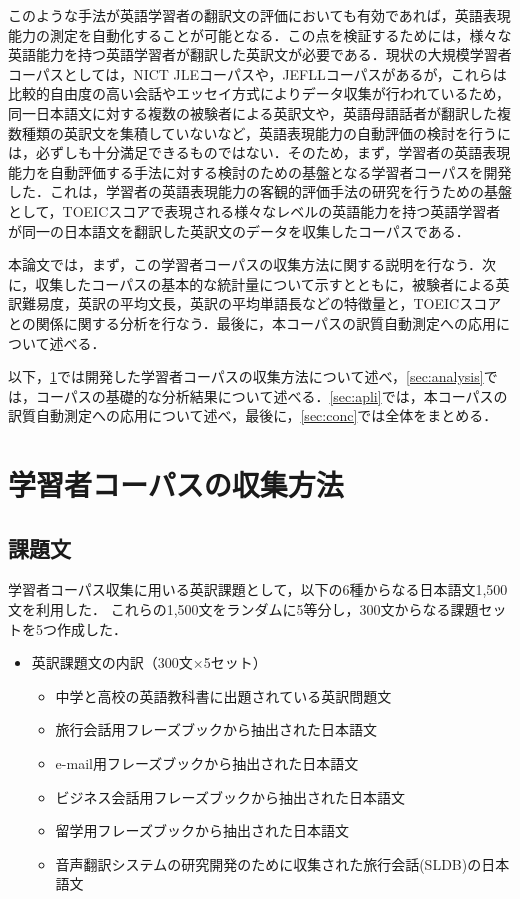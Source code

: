 \documentclass[japanese]{jnlp_1.4}
\begin{document}
このような手法が英語学習者の翻訳文の評価においても有効であれば，英語表現能力の測定を自動化することが可能となる．この点を検証するためには，様々な英語能力を持つ英語学習者が翻訳した英訳文が必要である．現状の大規模学習者コーパスとしては，NICT JLEコーパス\cite{izumi}や，JEFLLコーパス\cite{JEFLL}があるが，これらは比較的自由度の高い会話やエッセイ方式によりデータ収集が行われているため，同一日本語文に対する複数の被験者による英訳文や，英語母語話者が翻訳した複数種類の英訳文を集積していないなど，英語表現能力の自動評価の検討を行うには，必ずしも十分満足できるものではない．そのため，まず，学習者の英語表現能力を自動評価する手法に対する検討のための基盤となる学習者コーパスを開発した．これは，学習者の英語表現能力の客観的評価手法の研究を行うための基盤として，TOEICスコアで表現される様々なレベルの英語能力を持つ英語学習者が同一の日本語文を翻訳した英訳文のデータを収集したコーパスである．

本論文では，まず，この学習者コーパスの収集方法に関する説明を行なう．次に，収集したコーパスの基本的な統計量について示すとともに，被験者による英訳難易度，英訳の平均文長，英訳の平均単語長などの特徴量と，TOEICスコアとの関係に関する分析を行なう．最後に，本コーパスの訳質自動測定への応用について述べる．

以下，\ref{sec:corpus}では開発した学習者コーパスの収集方法について述べ，\ref{sec:analysis}では，コーパスの基礎的な分析結果について述べる．\ref{sec:apli}では，本コーパスの訳質自動測定への応用について述べ，最後に，\ref{sec:conc}では全体をまとめる．


\section{学習者コーパスの収集方法}\label{sec:corpus}

\subsection{課題文}\label{subsec:text_type}

学習者コーパス収集に用いる英訳課題として，以下の6種からなる日本語文1,500文を利用した．
これらの1,500文をランダムに5等分し，300文からなる課題セットを5つ作成した．
\begin{itemize}
\item 英訳課題文の内訳（300文×5セット）
	\begin{itemize}
	\item 中学と高校の英語教科書に出題されている英訳問題文
	\item 旅行会話用フレーズブックから抽出された日本語文\cite{kikui_eurospeech_2003}
	\item e-mail用フレーズブックから抽出された日本語文
	\item ビジネス会話用フレーズブックから抽出された日本語文
	\item 留学用フレーズブックから抽出された日本語文
	\item 音声翻訳システムの研究開発のために収集された旅行会話(SLDB)\cite{takezawa_cocosda_99}の日本語文
	\end{itemize}
\end{itemize}
\end{document}
